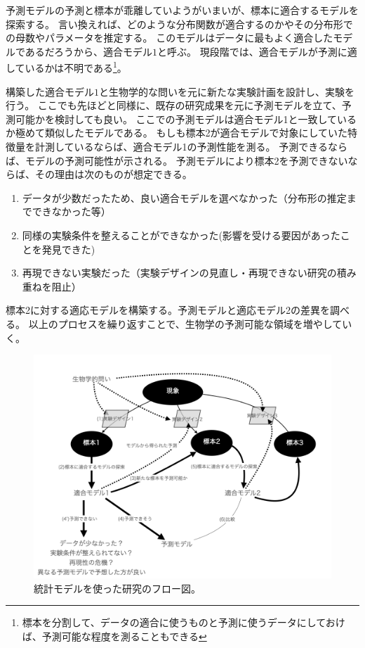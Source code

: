 予測モデルの予測と標本が乖離していようがいまいが、標本に適合するモデルを探索する。
言い換えれば、どのような分布関数が適合するのかやその分布形での母数やパラメータを推定する。
このモデルはデータに最もよく適合したモデルであるだろうから、適合モデル$1$と呼ぶ。
現段階では、適合モデルが予測に適しているかは不明である\footnote{標本を分割して、データの適合に使うものと予測に使うデータにしておけば、予測可能な程度を測ることもできる}。

構築した適合モデル$1$と生物学的な問いを元に新たな実験計画を設計し、実験を行う。
ここでも先ほどと同様に、既存の研究成果を元に予測モデルを立て、予測可能かを検討しても良い。
ここでの予測モデルは適合モデル1と一致しているか極めて類似したモデルである。
もしも標本2が適合モデルで対象にしていた特徴量を計測しているならば、適合モデル1の予測性能を測る。
予測できるならば、モデルの予測可能性が示される。
予測モデルにより標本2を予測できないならば、その理由は次のものが想定できる。
\begin{enumerate}
    \item データが少数だったため、良い適合モデルを選べなかった（分布形の推定までできなかった等）
    \item 同様の実験条件を整えることができなかった(影響を受ける要因があったことを発見できた)
    \item 再現できない実験だった（実験デザインの見直し・再現できない研究の積み重ねを阻止）
\end{enumerate}

標本2に対する適応モデルを構築する。予測モデルと適応モデル2の差異を調べる。
以上のプロセスを繰り返すことで、生物学の予測可能な領域を増やしていく。

\begin{figure}
    \begin{center}
        \includegraphics[width=15cm]{./image/01_/conceptual_diagram/conceptual_diagram.006.png}
        \caption{統計モデルを使った研究のフロー図。}
        \label{fig:conceptual_diagram_statistics_research}
    \end{center}
\end{figure}

